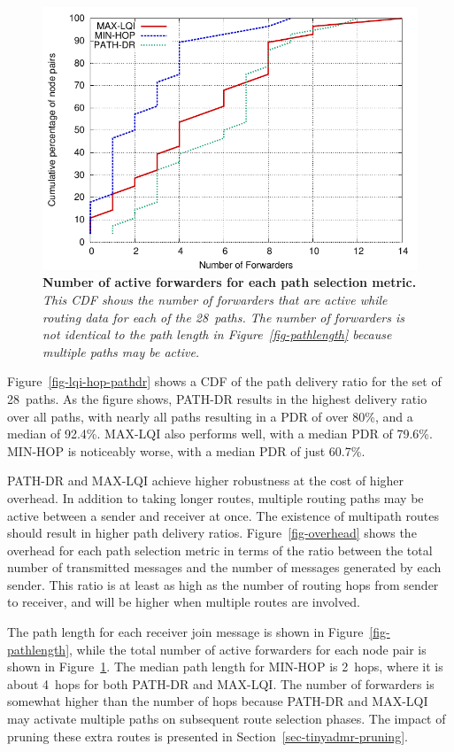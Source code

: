 \begin{figure}[t]
\begin{center}
\includegraphics[width=0.6\hsize]{resources/tinyadmr-techrept05/figures/lessons/lqivshop/lqi-hop-pathdr-cdf-fwd.pdf}
\end{center}
\caption{{\small {\bf Number of active forwarders for each path
selection metric.} {\em This CDF shows the number of forwarders that
are active while routing data for each of the 28~paths. The number of
forwarders is not identical to the path length in 
Figure~\ref{fig-pathlength} because
multiple paths may be active.}}}
\label{fig-num-forwarders}
\end{figure}


Figure~\ref{fig-lqi-hop-pathdr} shows a CDF of the path delivery ratio
for the set of 28~paths. As the figure shows, PATH-DR results in the
highest delivery ratio over all paths, with nearly all paths resulting
in a PDR of over 80\%, and a median of 92.4\%. MAX-LQI also performs
well, with a median PDR of 79.6\%. MIN-HOP is noticeably worse, with a
median PDR of just 60.7\%.

PATH-DR and MAX-LQI achieve higher robustness at the cost of
higher overhead. In addition to taking longer routes, 
multiple routing paths may be active between a sender and
receiver at once. The existence of multipath routes should
result in higher path delivery ratios. Figure~\ref{fig-overhead} shows
the overhead for each path selection metric 
in terms of the ratio between the total number of transmitted
messages and the number of messages generated by each sender.
This ratio is at least as high as the number of routing hops from
sender to receiver, and will be higher when multiple routes are involved. 

The path length for each receiver join message is shown in 
Figure~\ref{fig-pathlength}, while the total number of active
forwarders for each node pair is shown in Figure~\ref{fig-num-forwarders}.
The median path length for MIN-HOP is 2~hops, where it is about 
4~hops for both PATH-DR and MAX-LQI.
The number of forwarders is somewhat higher than the number of hops
because PATH-DR and MAX-LQI may activate multiple paths on 
subsequent route selection phases. The impact of pruning these
extra routes is presented in Section~\ref{sec-tinyadmr-pruning}.


